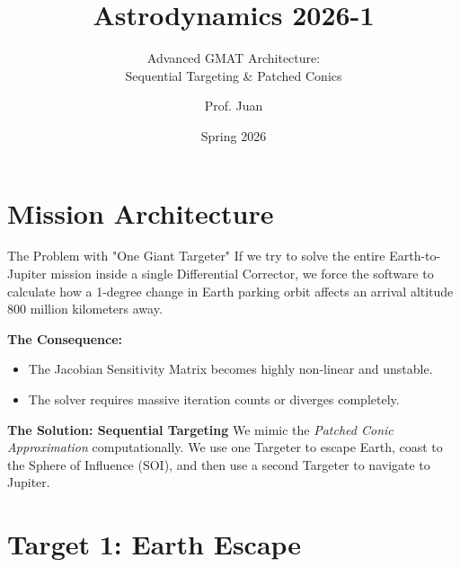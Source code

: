 \documentclass[11pt]{beamer}
\title[Sequential Targeting in GMAT]{Astrodynamics 2026-1}
\subtitle{Advanced GMAT Architecture: \\ Sequential Targeting \& Patched Conics}
\author{Prof. Juan}
\institute{Universidad de Antioquia - Aerospace Engineering}
\date{Spring 2026}
\begin{document}
\begin{frame}
    \titlepage
\end{frame}

\section{Mission Architecture}

\begin{frame}{The Problem with "One Giant Targeter"}
    If we try to solve the entire Earth-to-Jupiter mission inside a single Differential Corrector, we force the software to calculate how a 1-degree change in Earth parking orbit affects an arrival altitude 800 million kilometers away.
    
    \vspace{0.3cm}
    \textbf{The Consequence:}
    \begin{itemize}
        \item The Jacobian Sensitivity Matrix becomes highly non-linear and unstable.
        \item The solver requires massive iteration counts or diverges completely.
    \end{itemize}
    
    \vspace{0.3cm}
    \textbf{The Solution: Sequential Targeting}
    We mimic the \textit{Patched Conic Approximation} computationally. We use one Targeter to escape Earth, coast to the Sphere of Influence (SOI), and then use a second Targeter to navigate to Jupiter.
\end{frame}

\section{Target 1: Earth Escape}
\end{document}
